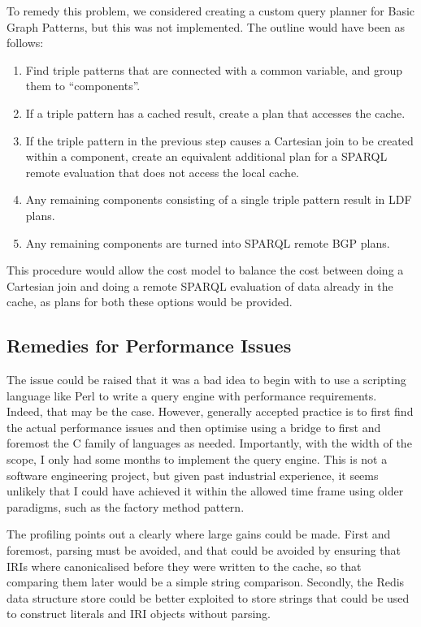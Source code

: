 To remedy this problem, we considered creating a custom query planner
for Basic Graph Patterns, but this was not implemented. The outline
would have been as follows:
\begin{enumerate}
\item Find triple patterns that are connected with a common variable,
  and group them to ``components''.
\item If a triple pattern has a cached result, create a plan that
  accesses the cache. 
\item If the triple pattern in the previous step causes a Cartesian
  join to be created within a component, create an equivalent
  additional plan for a SPARQL remote evaluation that does not access
  the local cache.
\item Any remaining components consisting of a single triple pattern
  result in LDF plans.
\item Any remaining components are turned into SPARQL remote BGP
  plans.
\end{enumerate}

This procedure would allow the cost model to balance the cost between
doing a Cartesian join and doing a remote SPARQL evaluation of data
already in the cache, as plans for both these options would be
provided.

\subsection{Remedies for Performance Issues}\label{sec:discussfail}

The issue could be raised that it was a bad idea to begin with to use a
scripting language like Perl to write a query engine with performance
requirements. Indeed, that may be the case. However, generally
accepted practice is to first find the actual performance issues and
then optimise using a bridge to first and foremost the C family of
languages as needed. Importantly, with the width of the scope, I only
had some months to implement the query engine. This is not a software
engineering project, but given past industrial experience, it seems
unlikely that I could have achieved it within the allowed time frame
using older paradigms, such as the factory method pattern.

The profiling points out a clearly where large gains could be
made. First and foremost, parsing must be avoided, and that could be
avoided by ensuring that IRIs where canonicalised before they were
written to the cache, so that comparing them later would be a simple
string comparison. Secondly, the Redis data structure store could be
better exploited to store strings that could be used to construct  
literals and IRI objects without parsing. 


